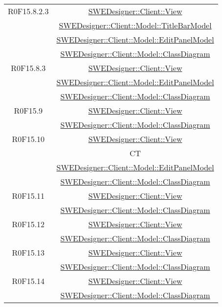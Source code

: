 \documentclass[../SpecificaTecnica.tex]{subfiles}
\begin{document}
\begin{longtable}{|c|c|}
		R0F15.8.2.3 & \hyperlink{SWEDesigner::Client::View}{SWEDesigner::Client::View}\\& \hyperlink{SWEDesigner::Client::Model::TitleBarModel}{SWEDesigner::Client::Model::TitleBarModel}\\& \hyperlink{SWEDesigner::Client::Model::EditPanelModel}{SWEDesigner::Client::Model::EditPanelModel}\\& \hyperlink{SWEDesigner::Client::Model::ClassDiagram}{SWEDesigner::Client::Model::ClassDiagram}\\\hline
		R0F15.8.3 & \hyperlink{SWEDesigner::Client::View}{SWEDesigner::Client::View}\\& \hyperlink{SWEDesigner::Client::Model::EditPanelModel}{SWEDesigner::Client::Model::EditPanelModel}\\& \hyperlink{SWEDesigner::Client::Model::ClassDiagram}{SWEDesigner::Client::Model::ClassDiagram}\\\hline
		R0F15.9 & \hyperlink{SWEDesigner::Client::View}{SWEDesigner::Client::View}\\& \hyperlink{SWEDesigner::Client::Model::ClassDiagram}{SWEDesigner::Client::Model::ClassDiagram}\\\hline
		R0F15.10 & \hyperlink{SWEDesigner::Client::View}{SWEDesigner::Client::View}\\& CT\\& \hyperlink{SWEDesigner::Client::Model::EditPanelModel}{SWEDesigner::Client::Model::EditPanelModel}\\& \hyperlink{SWEDesigner::Client::Model::ClassDiagram}{SWEDesigner::Client::Model::ClassDiagram}\\\hline
		R0F15.11 & \hyperlink{SWEDesigner::Client::View}{SWEDesigner::Client::View}\\& \hyperlink{SWEDesigner::Client::Model::ClassDiagram}{SWEDesigner::Client::Model::ClassDiagram}\\\hline
		R0F15.12 & \hyperlink{SWEDesigner::Client::View}{SWEDesigner::Client::View}\\& \hyperlink{SWEDesigner::Client::Model::ClassDiagram}{SWEDesigner::Client::Model::ClassDiagram}\\\hline
		R0F15.13 & \hyperlink{SWEDesigner::Client::View}{SWEDesigner::Client::View}\\& \hyperlink{SWEDesigner::Client::Model::ClassDiagram}{SWEDesigner::Client::Model::ClassDiagram}\\\hline
		R0F15.14 & \hyperlink{SWEDesigner::Client::View}{SWEDesigner::Client::View}\\& \hyperlink{SWEDesigner::Client::Model::ClassDiagram}{SWEDesigner::Client::Model::ClassDiagram}\\\hline

\end{longtable}
\end{document}
